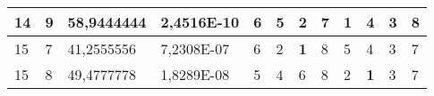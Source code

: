 \documentclass[conference]{IEEEtran}
\begin{document}
\begin{table*}[]
\begin{tabular}{|llll|llllllll|}
\multicolumn{1}{|l|}{14}                                                    & \multicolumn{1}{l|}{9}                                                        & \multicolumn{1}{l|}{58,9444444}                                                   & 2,4516E-10                     & \multicolumn{1}{l|}{6}                                                  & \multicolumn{1}{l|}{5}                                                  & \multicolumn{1}{l|}{2}                                                  & \multicolumn{1}{l|}{7}                                                  & \multicolumn{1}{l|}{\textbf{1}}                                         & \multicolumn{1}{l|}{4}                                                  & \multicolumn{1}{l|}{3}                                                  & 8                          \\ \hline
\multicolumn{1}{|l|}{15}                                                    & \multicolumn{1}{l|}{7}                                                        & \multicolumn{1}{l|}{41,2555556}                                                   & 7,2308E-07                     & \multicolumn{1}{l|}{6}                                                  & \multicolumn{1}{l|}{2}                                                  & \multicolumn{1}{l|}{\textbf{1}}                                         & \multicolumn{1}{l|}{8}                                                  & \multicolumn{1}{l|}{5}                                                  & \multicolumn{1}{l|}{4}                                                  & \multicolumn{1}{l|}{3}                                                  & 7                          \\ \hline
\multicolumn{1}{|l|}{15}                                                    & \multicolumn{1}{l|}{8}                                                        & \multicolumn{1}{l|}{49,4777778}                                                   & 1,8289E-08                     & \multicolumn{1}{l|}{5}                                                  & \multicolumn{1}{l|}{4}                                                  & \multicolumn{1}{l|}{6}                                                  & \multicolumn{1}{l|}{8}                                                  & \multicolumn{1}{l|}{2}                                                  & \multicolumn{1}{l|}{\textbf{1}}                                         & \multicolumn{1}{l|}{3}                                                  & 7                          \\ \hline

\end{tabular}
\end{table*}
\end{document}
